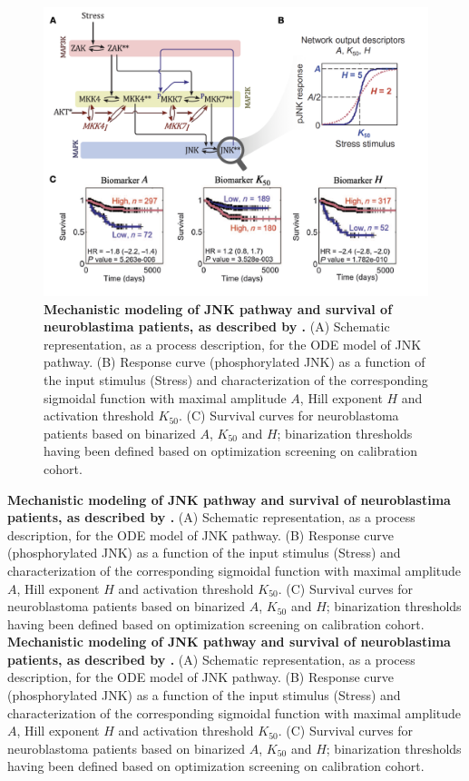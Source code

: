 \documentclass[a4paper,12pt,twoside,onecolumn,openright,final,oldfontcommands]{memoir}
\begin{document}
\begin{figure}

{\centering \includegraphics[width=0.9\linewidth]{fig/fey} 

}

\caption[Schematic example of logical and ODE modeling around MAPK signaling]{\textbf{Mechanistic modeling of JNK pathway and
survival of neuroblastima patients, as described by
\citet{fey2015signaling}.} (A) Schematic representation, as a process
description, for the ODE model of JNK pathway. (B) Response curve
(phosphorylated JNK) as a function of the input stimulus (Stress) and
characterization of the corresponding sigmoidal function with maximal
amplitude \(A\), Hill exponent \(H\) and activation threshold
\(K_{50}\). (C) Survival curves for neuroblastoma patients based on
binarized \(A\), \(K_{50}\) and \(H\); binarization thresholds having
been defined based on optimization screening on calibration cohort.}\label{fig:fey}
\end{figure}

\textbf{Mechanistic modeling of JNK pathway and
survival of neuroblastima patients, as described by
\citet{fey2015signaling}.} (A) Schematic representation, as a process
description, for the ODE model of JNK pathway. (B) Response curve
(phosphorylated JNK) as a function of the input stimulus (Stress) and
characterization of the corresponding sigmoidal function with maximal
amplitude \(A\), Hill exponent \(H\) and activation threshold
\(K_{50}\). (C) Survival curves for neuroblastoma patients based on
binarized \(A\), \(K_{50}\) and \(H\); binarization thresholds having
been defined based on optimization screening on calibration cohort. \textbf{Mechanistic modeling of JNK pathway and
survival of neuroblastima patients, as described by
\citet{fey2015signaling}.} (A) Schematic representation, as a process
description, for the ODE model of JNK pathway. (B) Response curve
(phosphorylated JNK) as a function of the input stimulus (Stress) and
characterization of the corresponding sigmoidal function with maximal
amplitude \(A\), Hill exponent \(H\) and activation threshold
\(K_{50}\). (C) Survival curves for neuroblastoma patients based on
binarized \(A\), \(K_{50}\) and \(H\); binarization thresholds having
been defined based on optimization screening on calibration cohort.
\end{document}
